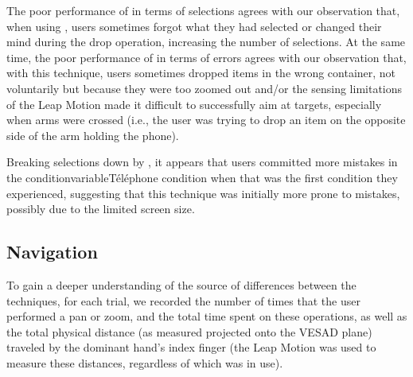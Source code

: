 The poor performance of  in terms of selections agrees with our observation that, when using , users sometimes forgot what they had selected or changed their mind during the drop operation, increasing the number of selections. At the same time, the poor performance of  in terms of errors agrees with our observation that, with this technique, users sometimes dropped items in the wrong container, not voluntarily but because they were too zoomed out and/or the sensing limitations of the Leap Motion made it difficult to successfully aim at targets, especially when arms were crossed (i.e., the user was trying to drop an item on the opposite side of the arm holding the phone).

Breaking selections down by  , it appears that users committed more mistakes in the conditionvariable{Téléphone} condition when that was the first condition they experienced, suggesting that this technique was initially more prone to mistakes, possibly due to the limited screen size.


\subsection{Navigation}
\label{subsec:experiment_results_navigation}
To gain a deeper understanding of the source of differences between
the techniques, for each trial, we recorded the number of times that the user performed a pan or zoom, and the total time spent on these operations,
as well as the total physical distance (as measured projected onto the VESAD plane) traveled by the dominant hand's index finger (the Leap Motion was used to measure these distances, regardless of which  was in use).

